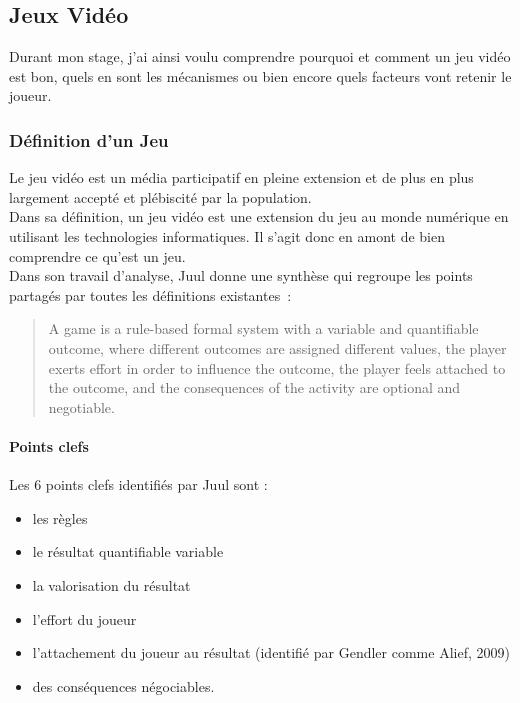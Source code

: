 \subsection{Jeux Vidéo}
Durant mon stage, j'ai ainsi voulu comprendre pourquoi et comment un jeu vidéo est bon, quels en sont les mécanismes ou bien encore quels facteurs vont retenir le joueur. 

	\subsubsection{Définition d'un Jeu}
Le jeu vidéo est un média participatif en pleine extension et de plus en plus largement accepté et plébiscité par la population. \\Dans sa définition, un jeu vidéo est une extension du jeu au monde numérique en utilisant les technologies informatiques. Il s'agit donc en amont de bien comprendre ce qu'est un jeu. \\Dans son travail d’analyse, Juul\cite{Juul05} donne une synthèse qui regroupe les points partagés par toutes les définitions existantes~:
\begin{quotation}
A game is a rule-based formal system with a variable and quantifiable outcome, where different outcomes are assigned different values, the player exerts effort in order to influence the outcome, the player feels attached to the outcome, and the consequences of the activity are optional and negotiable. 
\end{quotation}
\paragraph{Points clefs \\}
Les 6 points clefs identifiés par Juul sont :
\begin{itemize}
	\item les règles
	\item le résultat quantifiable variable
	\item la valorisation du résultat
	\item l’effort du joueur
	\item l’attachement du joueur au résultat (identifié par Gendler comme Alief, 2009)
	\item des conséquences négociables.
\end{itemize}

